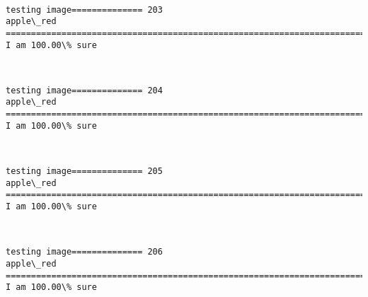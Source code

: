\documentclass[11pt]{article}
\begin{document}
    \begin{center}
    \end{center}
    { \hspace*{\fill} \\}
    
    \begin{Verbatim}[commandchars=\\\{\}]
testing image============== 203
apple\_red
============================================================================
I am 100.00\% sure

    \end{Verbatim}

    \begin{center}
    \end{center}
    { \hspace*{\fill} \\}
    
    \begin{Verbatim}[commandchars=\\\{\}]
testing image============== 204
apple\_red
============================================================================
I am 100.00\% sure

    \end{Verbatim}

    \begin{center}
    \end{center}
    { \hspace*{\fill} \\}
    
    \begin{Verbatim}[commandchars=\\\{\}]
testing image============== 205
apple\_red
============================================================================
I am 100.00\% sure

    \end{Verbatim}

    \begin{center}
    \end{center}
    { \hspace*{\fill} \\}
    
    \begin{Verbatim}[commandchars=\\\{\}]
testing image============== 206
apple\_red
============================================================================
I am 100.00\% sure

    \end{Verbatim}
\end{document}
